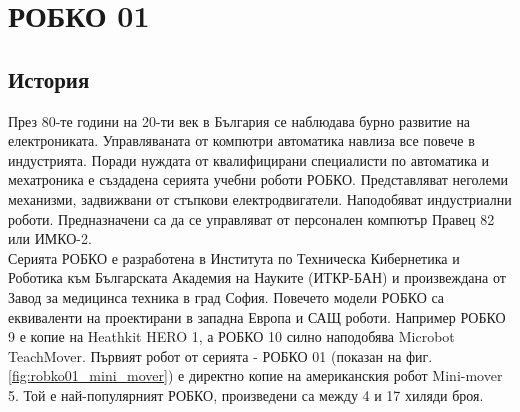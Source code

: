 \chapter{РОБКО 01}
\section{История}
През 80-те години на 20-ти век в България се наблюдава бурно развитие на електрониката.
\cite{NRB_electronics}
Управляваната от компютри автоматика навлиза все повече в индустрията. Поради нуждата от квалифицирани специалисти по автоматика и мехатроника е създадена серията учебни роботи РОБКО. Представляват неголеми механизми, задвижвани от стъпкови електродвигатели. Наподобяват индустриални роботи. Предназначени са да се управляват от персонален компютър Правец 82 или ИМКО-2.\\
\indent{} %
Серията РОБКО е разработена в Института по Техническа Кибернетика и Роботика към Българската Академия на Науките (ИТКР-БАН) и произвеждана от Завод за медицинса техника в град София. Повечето модели РОБКО са еквиваленти на проектирани в западна Европа и САЩ роботи. Например РОБКО 9 е копие на Heathkit HERO 1, а РОБКО 10 силно наподобява Microbot TeachMover.
\cite{robko-obscomp-history}
Първият робот от серията - РОБКО 01 (показан на фиг. \ref{fig:robko01_mini_mover}) е директно копие на американския робот Mini-mover 5. Той е най-популярният РОБКО, произведени са между 4 и 17 хиляди броя.
\cite{robko-obscomp-history}\\
\indent{}
